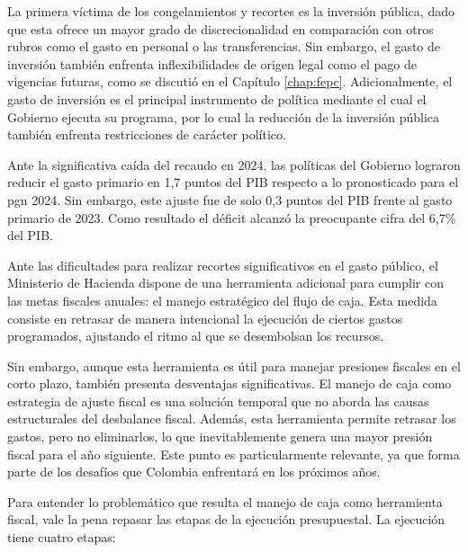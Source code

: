 La primera víctima de los congelamientos y recortes es la inversión pública, dado que esta ofrece un mayor grado de discrecionalidad en comparación con otros rubros como el gasto en personal o las transferencias. Sin embargo, el gasto de inversión también enfrenta inflexibilidades de origen legal como el pago de vigencias futuras, como se discutió en el Capítulo \ref{chap:fepc}. Adicionalmente, el gasto de inversión es el principal instrumento de política mediante el cual el Gobierno ejecuta su programa, por lo cual la reducción de la inversión pública también enfrenta restricciones de carácter político. 

Ante la significativa caída del recaudo en 2024, las políticas del Gobierno lograron reducir el gasto primario en 1,7 puntos del PIB respecto a lo pronosticado para el \gls{pgn} 2024. Sin embargo, este ajuste fue de solo 0,3 puntos del PIB frente al gasto primario de 2023. Como resultado el déficit alcanzó la preocupante cifra del 6,7\% del PIB. 

Ante las dificultades para realizar recortes significativos en el gasto público, el Ministerio de Hacienda dispone de una herramienta adicional para cumplir con las metas fiscales anuales: el manejo estratégico del flujo de caja. Esta medida consiste en retrasar de manera intencional la ejecución de ciertos gastos programados, ajustando el ritmo al que se desembolsan los recursos. 

Sin embargo, aunque esta herramienta es útil para manejar presiones fiscales en el corto plazo, también presenta desventajas significativas. El manejo de caja como estrategia de ajuste fiscal es una solución temporal que no aborda las causas estructurales del desbalance fiscal. Además, esta herramienta permite retrasar los gastos, pero no eliminarlos, lo que inevitablemente genera una mayor presión fiscal para el año siguiente. Este punto es particularmente relevante, ya que forma parte de los desafíos que Colombia enfrentará en los próximos años.

%

Para entender lo problemático que resulta el manejo de caja como herramienta fiscal, vale la pena repasar las etapas de la ejecución presupuestal. La ejecución tiene cuatro etapas:

